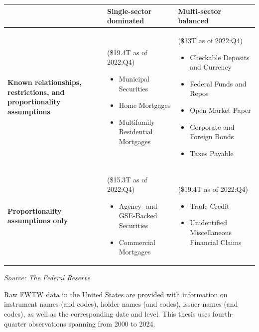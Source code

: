 \begin{table}[ht]
\begin{tabularx}{\textwidth}{>{\raggedright\arraybackslash}p{} 
                                  >{\raggedright\arraybackslash}X 
                                  >{\raggedright\arraybackslash}X}
 & \textbf{Single-sector dominated} & \textbf{Multi-sector balanced} \\
\midrule

\textbf{Known relationships, restrictions, and proportionality assumptions} 
& (\$19.4T as of 2022:Q4)
\begin{itemize}[leftmargin=*, itemsep=0pt, topsep=0pt]
\item Municipal Securities
\item Home Mortgages
\item Multifamily Residential Mortgages
\end{itemize}
& (\$33T as of 2022:Q4)
\begin{itemize}[leftmargin=*, itemsep=0pt, topsep=0pt]
\item Checkable Deposits and Currency
\item Federal Funds and Repos
\item Open Market Paper
\item Corporate and Foreign Bonds
\item Taxes Payable
\end{itemize} \\

\midrule

\textbf{Proportionality assumptions only} 
& (\$15.3T as of 2022:Q4)
\begin{itemize}[leftmargin=*, itemsep=0pt, topsep=0pt]
\item Agency- and GSE-Backed Securities
\item Commercial Mortgages
\end{itemize}
& (\$19.4T as of 2022:Q4)
\begin{itemize}[leftmargin=*, itemsep=0pt, topsep=0pt]
\item Trade Credit
\item Unidentified Miscellaneous Financial Claims
\end{itemize} \\

\bottomrule
\end{tabularx}

\vspace{4pt}
\begin{minipage}{\textwidth}
\footnotesize
\textit{Source: The Federal Reserve}
\end{minipage}

\label{tab:fwtw_classification}
\end{table}

Raw FWTW data in the United States are provided with information on instrument names (and codes), holder names (and codes), issuer names (and codes), as well as the corresponding date and level. This thesis uses fourth-quarter observations spanning from 2000 to 2024. 

